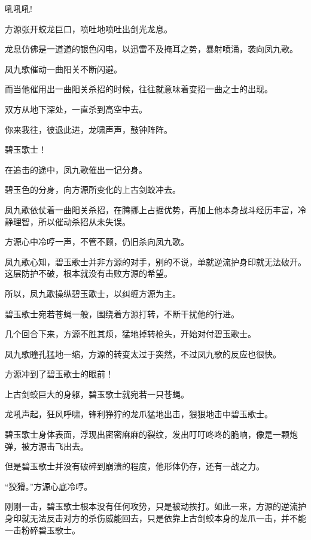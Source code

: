 
\begin{this_body}

吼吼吼!

方源张开蛟龙巨口，喷吐地喷吐出剑光龙息。

龙息仿佛是一道道的银色闪电，以迅雷不及掩耳之势，暴射喷涌，袭向凤九歌。

凤九歌催动一曲阳关不断闪避。

而当他催用出一曲阳关杀招的时候，往往就意味着变招一曲之士的出现。

双方从地下深处，一直杀到高空中去。

你来我往，彼退此进，龙啸声声，鼓钟阵阵。

碧玉歌士！

在追击的途中，凤九歌催出一记分身。

碧玉色的分身，向方源所变化的上古剑蛟冲去。

凤九歌依仗着一曲阳关杀招，在腾挪上占据优势，再加上他本身战斗经历丰富，冷静理智，所以催动杀招从未失误。

方源心中冷哼一声，不管不顾，仍旧杀向凤九歌。

凤九歌心知，碧玉歌士并非方源的对手，别的不说，单就逆流护身印就无法破开。这层防护不破，根本就没有击败方源的希望。

所以，凤九歌操纵碧玉歌士，以纠缠方源为主。

碧玉歌士宛若苍蝇一般，围绕着方源打转，不断干扰他的行进。

几个回合下来，方源不胜其烦，猛地掉转枪头，开始对付碧玉歌士。

凤九歌瞳孔猛地一缩，方源的转变太过于突然，不过凤九歌的反应也很快。

方源冲到了碧玉歌士的眼前！

上古剑蛟巨大的身躯，碧玉歌士就宛若一只苍蝇。

龙吼声起，狂风呼啸，锋利狰狞的龙爪猛地出击，狠狠地击中碧玉歌士。

碧玉歌士身体表面，浮现出密密麻麻的裂纹，发出叮叮咚咚的脆响，像是一颗炮弹，被方源击飞出去。

但是碧玉歌士并没有破碎到崩溃的程度，他形体仍存，还有一战之力。

“狡猾。”方源心底冷哼。

刚刚一击，碧玉歌士根本没有任何攻势，只是被动挨打。如此一来，方源的逆流护身印就无法反击对方的杀伤威能回去，只是依靠上古剑蛟本身的龙爪一击，并不能一击粉碎碧玉歌士。


\end{this_body}
